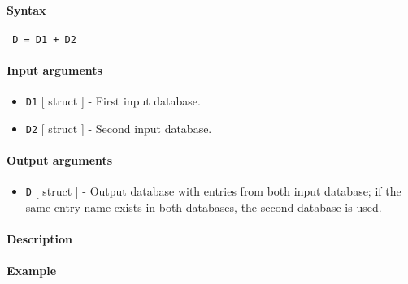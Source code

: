 


	\paragraph{Syntax}
 
 \begin{verbatim}
 D = D1 + D2
 \end{verbatim}
 
 \paragraph{Input arguments}
 
 \begin{itemize}
 \item
   \texttt{D1} {[} struct {]} - First input database.
 \item
   \texttt{D2} {[} struct {]} - Second input database.
 \end{itemize}
 
 \paragraph{Output arguments}
 
 \begin{itemize}
 \item
   \texttt{D} {[} struct {]} - Output database with entries from both
   input database; if the same entry name exists in both databases, the
   second database is used.
 \end{itemize}
 
 \paragraph{Description}
 
 \paragraph{Example}


